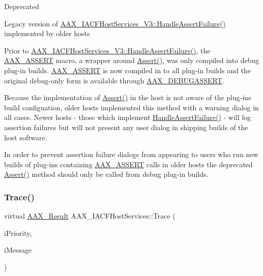 \begin{DoxyRefDesc}{Deprecated}
\item[\mbox{\hyperlink{a00788__deprecated000014}{Deprecated}}]Legacy version of \mbox{\hyperlink{a01721_aaaddbd89dd3d6dd2e9e9def5b99c579f}{A\+A\+X\+\_\+\+I\+A\+C\+F\+Host\+Services\+\_\+\+V3\+::\+Handle\+Assert\+Failure()}} implemented by older hosts\end{DoxyRefDesc}


Prior to \mbox{\hyperlink{a01721_aaaddbd89dd3d6dd2e9e9def5b99c579f}{A\+A\+X\+\_\+\+I\+A\+C\+F\+Host\+Services\+\_\+\+V3\+::\+Handle\+Assert\+Failure()}}, the \mbox{\hyperlink{a00395_a168ee44fd7a5485ab50160db36fb2988}{A\+A\+X\+\_\+\+A\+S\+S\+E\+RT}} macro, a wrapper around \mbox{\hyperlink{a01713_a49111de18abd12b671ae16138e244af3}{Assert()}}, was only compiled into debug plug-\/in builds. \mbox{\hyperlink{a00395_a168ee44fd7a5485ab50160db36fb2988}{A\+A\+X\+\_\+\+A\+S\+S\+E\+RT}} is now compiled in to all plug-\/in builds and the original debug-\/only form is available through \mbox{\hyperlink{a00395_aa0253bd2994036fcfd6629ecf465d543}{A\+A\+X\+\_\+\+D\+E\+B\+U\+G\+A\+S\+S\+E\+RT}}.

Because the implementation of \mbox{\hyperlink{a01713_a49111de18abd12b671ae16138e244af3}{Assert()}} in the host is not aware of the plug-\/in\textquotesingle{}s build configuation, older hosts implemented this method with a warning dialog in all cases. Newer hosts -\/ those which implement \mbox{\hyperlink{a01721_aaaddbd89dd3d6dd2e9e9def5b99c579f}{Handle\+Assert\+Failure()}} -\/ will log assertion failures but will not present any user dialog in shipping builds of the host software.

In order to prevent assertion failure dialogs from appearing to users who run new builds of plug-\/ins containing \mbox{\hyperlink{a00395_a168ee44fd7a5485ab50160db36fb2988}{A\+A\+X\+\_\+\+A\+S\+S\+E\+RT}} calls in older hosts the deprecated \mbox{\hyperlink{a01713_a49111de18abd12b671ae16138e244af3}{Assert()}} method should only be called from debug plug-\/in builds. \mbox{\label{a01713_ac6a48553ca0643d2505ce23862921a80}} 
\subsubsection{\texorpdfstring{Trace()}{Trace()}}
{\footnotesize\ttfamily virtual \mbox{\hyperlink{a00392_a4d8f69a697df7f70c3a8e9b8ee130d2f}{A\+A\+X\+\_\+\+Result}} A\+A\+X\+\_\+\+I\+A\+C\+F\+Host\+Services\+::\+Trace (\begin{DoxyParamCaption}\item[{int32\+\_\+t}]{i\+Priority,  }\item[{const char $\ast$}]{i\+Message }\end{DoxyParamCaption})\hspace{0.3cm}{\ttfamily [pure virtual]}}



